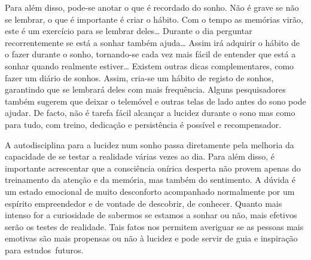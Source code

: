 \documentclass{report}
\begin{document}
Para além disso, pode-se anotar o que é recordado do sonho. Não é grave se não se lembrar, o que é importante é criar o hábito. Com o tempo as memórias virão, este é um exercício para se lembrar deles… Durante o dia perguntar recorrentemente se está a sonhar também ajuda… Assim irá adquirir o hábito de o fazer durante o sonho, tornando-se cada vez mais fácil de entender que está a sonhar quando realmente estiver… Existem outras dicas complementares, como fazer um diário de sonhos.  Assim, cria-se um hábito de registo de sonhos, garantindo que se lembrará deles com mais frequência. Alguns pesquisadores também sugerem que deixar o telemóvel e outras telas de lado antes do sono pode ajudar. De facto, não é tarefa fácil alcançar a lucidez durante o sono mas como para tudo, com treino, dedicação e persistência é possível e recompensador.


A autodisciplina para a lucidez num sonho passa diretamente pela melhoria da capacidade de se testar a realidade várias vezes ao dia. Para além disso, é importante acrescentar que a consciência onírica desperta não provem apenas do treinamento da atenção e da memória, mas também do sentimento. A dúvida é um estado emocional de muito desconforto acompanhado normalmente por um espírito empreendedor e de vontade de descobrir, de conhecer. Quanto mais intenso for a curiosidade de sabermos se estamos a sonhar ou não, mais efetivos serão os testes de realidade. Tais fatos nos permitem averiguar se as pessoas mais emotivas são mais propensas ou não à lucidez e pode servir de guia e inspiração para estudos futuros.
\end{document}
